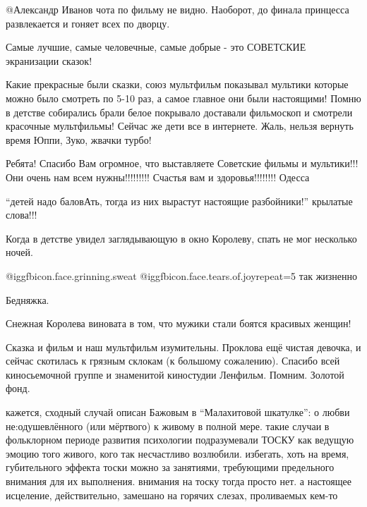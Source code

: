\begin{itemize}
\begin{multicols}{2}
\begin{itemize}
 @Александр Иванов  чота по фильму не видно. Наоборот, до финала принцесса
 развлекается и гоняет всех по дворцу.

\end{itemize} %


Самые лучшие, самые человечные, самые добрые - это СОВЕТСКИЕ экранизации сказок!


Какие прекрасные были сказки, союз мультфильм показывал мультики которые можно
было смотреть по 5-10 раз, а самое главное они были настоящими! Помню в детстве
собирались брали белое покрывало доставали фильмоскоп и смотрели красочные
мультфильмы! Сейчас же дети все в интернете. Жаль, нельзя вернуть время
Юппи, Зуко, жвачки турбо!


Ребята! Спасибо Вам огромное, что выставляете Советские фильмы и мультики!!!
Они очень нам всем нужны!!!!!!!!! Счастья вам и здоровья!!!!!!!! Одесса


\enquote{детей надо баловАть, тогда из них вырастут  настоящие разбойники!}  крылатые
слова!!!

Когда  в детстве увидел заглядывающую в окно Королеву, спать не мог несколько ночей.

\begin{itemize} %
 @igg{fbicon.face.grinning.sweat}  @igg{fbicon.face.tears.of.joy}{repeat=5} так жизненно

Бедняжка.

Снежная Королева виновата в том, что мужики стали боятся красивых женщин!
\end{itemize} %


Сказка и фильм и наш мультфильм изумительны. Проклова ещё чистая девочка, и
сейчас скотилась к грязным склокам (к большому сожалению). Спасибо всей
киносьемочной группе и знаменитой киностудии Ленфильм. Помним. Золотой фонд.

\end{multicols}

\zzrule


кажется, сходный случай описан Бажовым в \enquote{Малахитовой шкатулке}: о любви
не:одушевлённого (или мёртвого) к живому в полной мере. такие случаи в
фольклорном периоде развития психологии подразумевали ТОСКУ как ведущую эмоцию
того живого, кого так несчастливо возлюбили. избегать, хоть на время,
губительного эффекта тоски можно за занятиями, требующими предельного внимания
для их выполнения. внимания на тоску тогда просто нет. а настоящее исцеление,
действительно, замешано на горячих слезах, проливаемых кем-то


\end{itemize}
